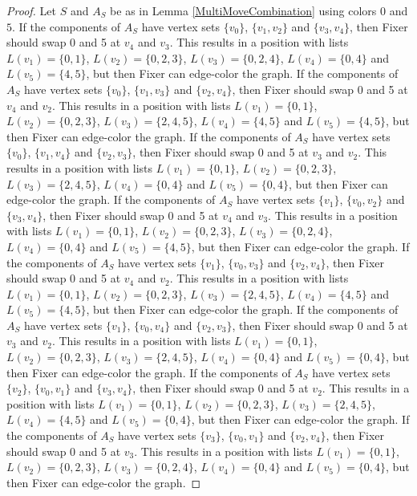 \documentclass[12pt]{amsart}
\theoremstyle{plain}
\theoremstyle{definition}
\theoremstyle{remark}
\begin{document}
\begin{proof}
Let $S$ and $A_S$ be as in Lemma \ref{MultiMoveCombination} using colors $0$ and $5$. If the components of $A_S$ have vertex sets $\{v_0\}$, $\{v_1, v_2\}$ and $\{v_3, v_4\}$, then Fixer should swap 0 and 5 at $v_4$ and $v_3$. This results in a position with lists $L(v_1) = \{0, 1\}$, $L(v_2) = \{0, 2, 3\}$, $L(v_3) = \{0, 2, 4\}$, $L(v_4) = \{0, 4\}$ and $L(v_5) = \{4, 5\}$, but then Fixer can edge-color the graph.
If the components of $A_S$ have vertex sets $\{v_0\}$, $\{v_1, v_3\}$ and $\{v_2, v_4\}$, then Fixer should swap 0 and 5 at $v_4$ and $v_2$. This results in a position with lists $L(v_1) = \{0, 1\}$, $L(v_2) = \{0, 2, 3\}$, $L(v_3) = \{2, 4, 5\}$, $L(v_4) = \{4, 5\}$ and $L(v_5) = \{4, 5\}$, but then Fixer can edge-color the graph.
If the components of $A_S$ have vertex sets $\{v_0\}$, $\{v_1, v_4\}$ and $\{v_2, v_3\}$, then Fixer should swap 0 and 5 at $v_3$ and $v_2$. This results in a position with lists $L(v_1) = \{0, 1\}$, $L(v_2) = \{0, 2, 3\}$, $L(v_3) = \{2, 4, 5\}$, $L(v_4) = \{0, 4\}$ and $L(v_5) = \{0, 4\}$, but then Fixer can edge-color the graph.
If the components of $A_S$ have vertex sets $\{v_1\}$, $\{v_0, v_2\}$ and $\{v_3, v_4\}$, then Fixer should swap 0 and 5 at $v_4$ and $v_3$. This results in a position with lists $L(v_1) = \{0, 1\}$, $L(v_2) = \{0, 2, 3\}$, $L(v_3) = \{0, 2, 4\}$, $L(v_4) = \{0, 4\}$ and $L(v_5) = \{4, 5\}$, but then Fixer can edge-color the graph.
If the components of $A_S$ have vertex sets $\{v_1\}$, $\{v_0, v_3\}$ and $\{v_2, v_4\}$, then Fixer should swap 0 and 5 at $v_4$ and $v_2$. This results in a position with lists $L(v_1) = \{0, 1\}$, $L(v_2) = \{0, 2, 3\}$, $L(v_3) = \{2, 4, 5\}$, $L(v_4) = \{4, 5\}$ and $L(v_5) = \{4, 5\}$, but then Fixer can edge-color the graph.
If the components of $A_S$ have vertex sets $\{v_1\}$, $\{v_0, v_4\}$ and $\{v_2, v_3\}$, then Fixer should swap 0 and 5 at $v_3$ and $v_2$. This results in a position with lists $L(v_1) = \{0, 1\}$, $L(v_2) = \{0, 2, 3\}$, $L(v_3) = \{2, 4, 5\}$, $L(v_4) = \{0, 4\}$ and $L(v_5) = \{0, 4\}$, but then Fixer can edge-color the graph.
If the components of $A_S$ have vertex sets $\{v_2\}$, $\{v_0, v_1\}$ and $\{v_3, v_4\}$, then Fixer should swap 0 and 5 at $v_2$. This results in a position with lists $L(v_1) = \{0, 1\}$, $L(v_2) = \{0, 2, 3\}$, $L(v_3) = \{2, 4, 5\}$, $L(v_4) = \{4, 5\}$ and $L(v_5) = \{0, 4\}$, but then Fixer can edge-color the graph.
If the components of $A_S$ have vertex sets $\{v_3\}$, $\{v_0, v_1\}$ and $\{v_2, v_4\}$, then Fixer should swap 0 and 5 at $v_3$. This results in a position with lists $L(v_1) = \{0, 1\}$, $L(v_2) = \{0, 2, 3\}$, $L(v_3) = \{0, 2, 4\}$, $L(v_4) = \{0, 4\}$ and $L(v_5) = \{0, 4\}$, but then Fixer can edge-color the graph.

\end{proof}
\end{document}
